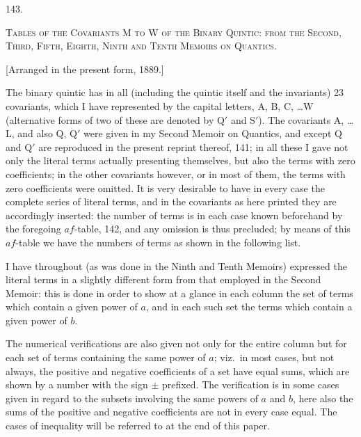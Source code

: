 \documentclass[11pt,a4paper]{article}
\begin{document}
\clearpage
\setcounter{page}{282}

\begin{center}
\textsc{143.}
\end{center}

\begin{center}
\textsc{Tables of the Covariants M to W of the Binary Quintic: from the Second, Third, Fifth, Eighth, Ninth and Tenth Memoirs on Quantics.}
\end{center}

\begin{center}
[Arranged in the present form, 1889.]
\end{center}

The binary quintic has in all (including the quintic itself and the invariants) 23 covariants, which I have represented by the capital letters, A, B, C, \ldots W (alternative forms of two of these are denoted by Q$'$ and S$'$). The covariants A, \ldots L, and also Q, Q$'$ were given in my Second Memoir on Quantics, and except Q and Q$'$ are reproduced in the present reprint thereof, 141; in all these I gave not only the literal terms actually presenting themselves, but also the terms with zero coefficients; in the other covariants however, or in most of them, the terms with zero coefficients were omitted. It is very desirable to have in every case the complete series of literal terms, and in the covariants as here printed they are accordingly inserted: the number of terms is in each case known beforehand by the foregoing $af$-table, 142, and any omission is thus precluded; by means of this $af$-table we have the numbers of terms as shown in the following list.

I have throughout (as was done in the Ninth and Tenth Memoirs) expressed the literal terms in a slightly different form from that employed in the Second Memoir: this is done in order to show at a glance in each column the set of terms which contain a given power of $a$, and in each such set the terms which contain a given power of $b$.

The numerical verifications are also given not only for the entire column but for each set of terms containing the same power of $a$; viz.\ in most cases, but not always, the positive and negative coefficients of a set have equal sums, which are shown by a number with the sign $\pm$ prefixed. The verification is in some cases given in regard to the subsets involving the same powers of $a$ and $b$, here also the sums of the positive and negative coefficients are not in every case equal. The cases of inequality will be referred to at the end of this paper.
\end{document}

